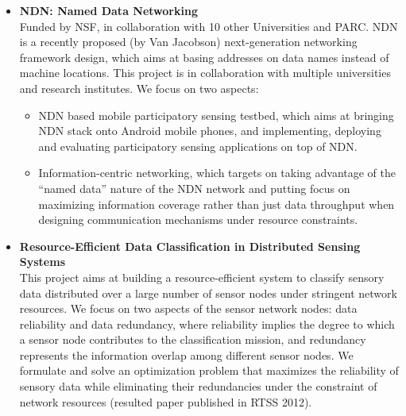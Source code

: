 \begin{itemize}
\item \textbf{NDN: Named Data Networking} \\ Funded by NSF, in
  collaboration with 10 other Universities and PARC. NDN is a recently
  proposed (by Van Jacobson) next-generation networking framework
  design, which aims at basing addresses on data names instead of
  machine locations. This project is in collaboration with multiple
  universities and research institutes. We focus on two aspects:
\begin{itemize}
\item NDN based mobile participatory sensing testbed, which aims at
  bringing NDN stack onto Android mobile phones, and implementing,
  deploying and evaluating participatory sensing applications on top
  of NDN.
\item Information-centric networking, which targets on taking
  advantage of the ``named data'' nature of the NDN network and
  putting focus on maximizing information coverage rather than just
  data throughput when designing communication mechanisms under
  resource constraints.
\end{itemize}

\item \textbf{Resource-Efficient Data Classification in Distributed
  Sensing Systems} \\ This project aims at building a
  resource-efficient system to classify sensory data distributed over
  a large number of sensor nodes under stringent network resources.
  We focus on two aspects of the sensor network nodes: data
  reliability and data redundancy, where reliability implies the
  degree to which a sensor node contributes to the classification
  mission, and redundancy represents the information overlap among
  different sensor nodes. We formulate and solve an optimization
  problem that maximizes the reliability of sensory data while
  eliminating their redundancies under the constraint of network
  resources (resulted paper published in \textsc{RTSS 2012}).

\end{itemize}


